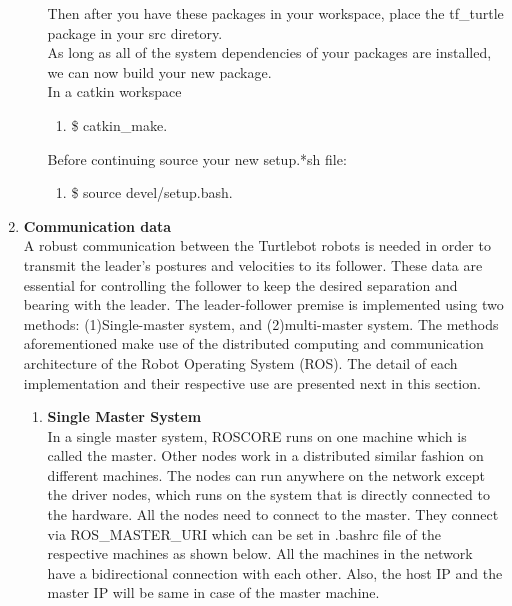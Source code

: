 \documentclass[journal]{IEEEtran}
\begin{document}
\begin{enumerate}
\begin{enumerate}
\begin{enumerate}
\end{enumerate}

Then after you have these packages in your workspace, place the tf{\_}turtle\cite{temp11} package in your src diretory.\\
As long as all of the system dependencies of your packages are installed, we can now build your new package.\\
In a catkin workspace
\begin{enumerate} 
\item {{\$} catkin{\_}make}.
\end{enumerate}

Before continuing source your new setup.*sh file:
\begin{enumerate}
\item {{\$} source devel/setup.bash}.
\end{enumerate}

\end{enumerate}








\item \textbf {Communication data}\\
A robust communication between the Turtlebot robots is needed in order to transmit the leader’s postures and velocities to its follower. These data are essential for controlling the follower to keep the desired separation and bearing with the leader. The leader-follower premise is implemented using two methods: (1)Single-master system, and (2)multi-master system. The methods aforementioned make use of the distributed computing and communication architecture of the Robot Operating System (ROS). The detail of each implementation and their respective use are presented next in this section. 

\begin{enumerate} 
\item \textbf {Single Master System}\\

In a single master system, ROSCORE runs on one machine
which is called the master. Other nodes work in a distributed similar fashion on different machines. The nodes can run anywhere on the network except the driver nodes, which runs on the system that is directly connected to the hardware. All the nodes need to connect to the master. They connect via ROS{\_}MASTER{\_}URI which can be set in .bashrc file of the respective machines as shown below. All the machines in the network have a bidirectional connection with each other. Also, the host IP and the master IP will be same in case of the master machine.



\end{enumerate}
\end{enumerate}
\end{document}
